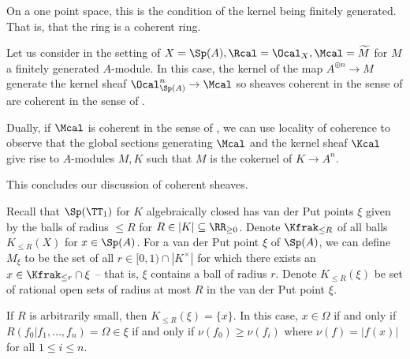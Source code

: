 \begin{remark}
    On a one point space, this is the condition of the kernel being finitely generated. That is, that the ring is a coherent ring. 
\end{remark}
\begin{example}
    Let us consider  in the setting of $X=\Sp(A),\Rcal=\Ocal_{X},\Mcal=\widetilde{M}$ for $M$ a finitely generated $A$-module. In this case, the kernel of the map $A^{\oplus n}\to M$ generate the kernel sheaf $\Ocal_{\Sp(A)}^{n}\to\Mcal$ so sheaves coherent in the sense of  are coherent in the sense of . 

    Dually, if $\Mcal$ is coherent in the sense of , we can use locality of coherence  to observe that the global sections generating $\Mcal$ and the kernel sheaf $\Kcal$ give rise to $A$-modules $M,K$ such that $M$ is the cokernel of $K\to A^{n}$. 
\end{example}
This concludes our discussion of coherent sheaves.

Recall that $\Sp(\TT_{1})$ for $K$ algebraically closed has van der Put points $\xi$ given by the balls of radius $\leq R$ for $R\in|K|\subseteq\RR_{\geq0}$. Denote $\Kfrak_{\leq R}$ of all balls $K_{\leq R}(X)$ for $x\in\Sp(A)$. For a van der Put point $\xi$ of $\Sp(A)$, we can define $M_{\xi}$ to be the set of all $r\in [0,1)\cap |K^{\times}|$ for which there exists an $x\in\Kfrak_{\leq r}\cap\xi$ -- that is, $\xi$ contains a ball of radius $r$. Denote $K_{\leq R}(\xi)$ be set of rational open sets of radius at most $R$ in the van der Put point $\xi$. 
\begin{example}
    If $R$ is arbitrarily small, then $K_{\leq R}(\xi)=\{x\}$. In this case, $x\in\Omega$ if and only if $R(f_{0}|f_{1},\dots,f_{n})=\Omega\in\xi$ if and only if $\nu(f_{0})\geq\nu(f_{i})$ where $\nu(f)=|f(x)|$ for all $1\leq i\leq n$. 
\end{example}
